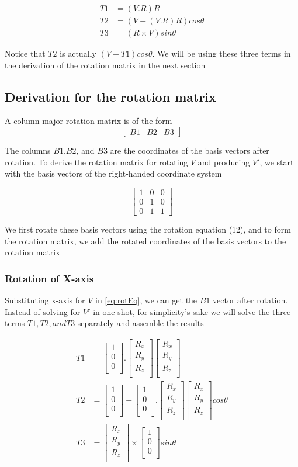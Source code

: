 \documentclass{article}
\newcommand{\xaxis}{
    \begin{bmatrix}
        1 \\
        0 \\
        0 \\
    \end{bmatrix}
}
\newcommand{\rotAxis}{
    \begin{bmatrix}
        R_x \\
        R_y \\
        R_z \\
    \end{bmatrix}
}
\newcommand{\vparallelForX}{
    \xaxis . \rotAxis 
    \rotAxis
}
\begin{document}
    \begin{align}
        T1 &= (V.R) R \\
        T2 &= (V - (V.R) R) cos\theta \\
        T3 &= (R \times V) sin\theta
    \end{align}

    \noindent Notice that $T2$ is actually $(V-T1) cos\theta$. We will be using these three terms in the derivation of the rotation matrix in the next section


    \subsection*{Derivation for the rotation matrix}

    A column-major rotation matrix is of the form
    \[
        \begin{bmatrix}
            B1 & B2 & B3
        \end{bmatrix}
    \]

    The columns $B1$,$B2$, and $B3$ are the coordinates of the basis vectors after rotation. To derive the rotation matrix for rotating $V$ and producing $V'$, we start with the basis vectors of the right-handed coordinate system

    \[
        \begin{bmatrix}
            1 & 0 & 0 \\
            0 & 1 & 0 \\
            0 & 1 & 1
        \end{bmatrix}
    \]

    We first rotate these basis vectors using the rotation equation (12), and to form the rotation matrix, we add the rotated coordinates of the basis vectors to the rotation matrix

    \subsubsection*{Rotation of X-axis}

    Substituting x-axis for $V$ in \ref{eq:rotEq}, we can get the $B1$ vector after rotation. Instead of solving for $V'$ in one-shot, for simplicity's sake we will solve the three terms $T1,T2, and T3$ separately and assemble the results 
   
    \begin{align}
        T1 &= \vparallelForX \\
        T2 &= \xaxis - \vparallelForX cos\theta \\
        T3 &= \rotAxis \times \xaxis sin\theta 
    \end{align}
\end{document}
